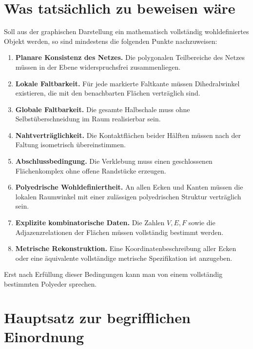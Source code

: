 \documentclass[11pt]{article}
\theoremstyle{plain}
\theoremstyle{definition}
\theoremstyle{remark}
\begin{document}
	\section{Was tatsächlich zu beweisen wäre}
	
	Soll aus der graphischen Darstellung ein mathematisch vollständig wohldefiniertes Objekt werden, so sind mindestens die folgenden Punkte nachzuweisen:
	
	\begin{enumerate}[label=\textbf{\arabic*.}, leftmargin=*, itemsep=0.35em]
		\item \textbf{Planare Konsistenz des Netzes.}  
		Die polygonalen Teilbereiche des Netzes müssen in der Ebene widerspruchsfrei zusammenliegen.
		
		\item \textbf{Lokale Faltbarkeit.}  
		Für jede markierte Faltkante müssen Dihedralwinkel existieren, die mit den benachbarten Flächen verträglich sind.
		
		\item \textbf{Globale Faltbarkeit.}  
		Die gesamte Halbschale muss ohne Selbstüberschneidung im Raum realisierbar sein.
		
		\item \textbf{Nahtverträglichkeit.}  
		Die Kontaktflächen beider Hälften müssen nach der Faltung isometrisch übereinstimmen.
		
		\item \textbf{Abschlussbedingung.}  
		Die Verklebung muss einen geschlossenen Flächenkomplex ohne offene Randstücke erzeugen.
		
		\item \textbf{Polyedrische Wohldefiniertheit.}  
		An allen Ecken und Kanten müssen die lokalen Raumwinkel mit einer zulässigen polyedrischen Struktur verträglich sein.
		
		\item \textbf{Explizite kombinatorische Daten.}  
		Die Zahlen \(V,E,F\) sowie die Adjazenzrelationen der Flächen müssen vollständig bestimmt werden.
		
		\item \textbf{Metrische Rekonstruktion.}  
		Eine Koordinatenbeschreibung aller Ecken oder eine äquivalente vollständige metrische Spezifikation ist anzugeben.
	\end{enumerate}
	
	Erst nach Erfüllung dieser Bedingungen kann man von einem vollständig bestimmten Polyeder sprechen.
	
	\section{Hauptsatz zur begrifflichen Einordnung}
	
\end{document}
